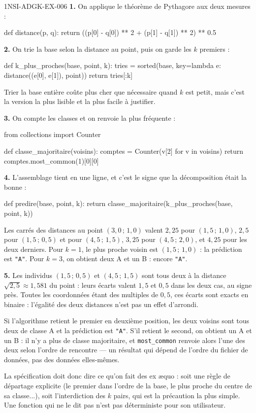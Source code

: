 \begin{corrige}{1NSI-ADGK-EX-006}
\textbf{1.} On applique le théorème de Pythagore aux deux mesures :
\begin{python}
def distance(p, q):
    return ((p[0] - q[0]) ** 2 + (p[1] - q[1]) ** 2) ** 0.5
\end{python}

\textbf{2.} On trie la base selon la distance au point, puis on garde les $k$
premiers :
\begin{python}
def k_plus_proches(base, point, k):
    tries = sorted(base, key=lambda e: distance((e[0], e[1]), point))
    return tries[:k]
\end{python}
Trier la base entière coûte plus cher que nécessaire quand $k$ est petit, mais
c'est la version la plus lisible et la plus facile à justifier.

\textbf{3.} On compte les classes et on renvoie la plus fréquente :
\begin{python}
from collections import Counter

def classe_majoritaire(voisins):
    comptes = Counter(v[2] for v in voisins)
    return comptes.most_common(1)[0][0]
\end{python}

\textbf{4.} L'assemblage tient en une ligne, et c'est le signe que la
décomposition était la bonne :
\begin{python}
def predire(base, point, k):
    return classe_majoritaire(k_plus_proches(base, point, k))
\end{python}
Les carrés des distances au point $(3{,}0\,;\,1{,}0)$ valent $2{,}25$ pour
$(1{,}5\,;\,1{,}0)$, $2{,}5$ pour $(1{,}5\,;\,0{,}5)$ et pour
$(4{,}5\,;\,1{,}5)$, $3{,}25$ pour $(4{,}5\,;\,2{,}0)$, et $4{,}25$ pour les
deux derniers. Pour $k=1$, le plus proche voisin est $(1{,}5\,;\,1{,}0)$ : la
prédiction est \lstinline{"A"}. Pour $k=3$, on obtient deux A et un B : encore
\lstinline{"A"}.

\textbf{5.} Les individus $(1{,}5\,;\,0{,}5)$ et $(4{,}5\,;\,1{,}5)$ sont tous
deux à la distance $\sqrt{2{,}5}\approx 1{,}581$ du point : leurs écarts valent
$1{,}5$ et $0{,}5$ dans les deux cas, au signe près. Toutes les coordonnées
étant des multiples de $0{,}5$, ces écarts sont exacts en binaire : l'égalité
des deux distances n'est pas un effet d'arrondi.

Si l'algorithme retient le premier en deuxième position, les deux voisins sont
tous deux de classe A et la prédiction est \lstinline{"A"}. S'il retient le
second, on obtient un A et un B : il n'y a plus de classe majoritaire, et
\lstinline{most_common} renvoie alors l'une des deux selon l'ordre de rencontre
— un résultat qui dépend de l'ordre du fichier de données, pas des données
elles-mêmes.

La spécification doit donc dire ce qu'on fait des ex \ae quo : soit une règle de
départage explicite (le premier dans l'ordre de la base, le plus proche du
centre de sa classe...), soit l'interdiction des $k$ pairs, qui est la
précaution la plus simple. Une fonction qui ne le dit pas n'est pas déterministe
pour son utilisateur.
\end{corrige}

